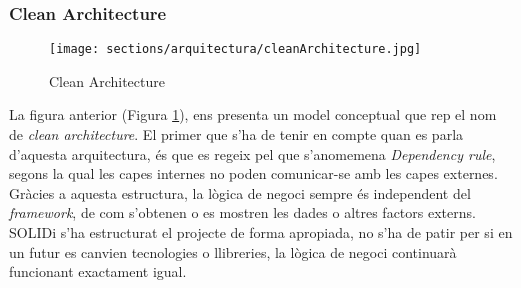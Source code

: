 \subsubsection{Clean Architecture}
\label{arquitectura:back_clean}
\begin{figure}[h]
\texttt{[image: sections/arquitectura/cleanArchitecture.jpg]}
\centering
\caption{Clean Architecture}
\label{fig:clean_architecture}
\end{figure}
La figura anterior (Figura \ref{fig:clean_architecture}), ens presenta un model conceptual que rep el nom de \textit{clean architecture}\cite{clean}.%
El primer que s'ha de tenir en compte quan es parla d'aquesta arquitectura, és que es regeix pel que s'anomemena \textit{Dependency rule}, segons la qual les capes internes no poden comunicar-se amb les capes externes.\\
\newline Gràcies a aquesta estructura, la lògica de negoci sempre és independent del \textit{framework}, de com s'obtenen o es mostren les dades o altres factors externs.\\
\newline SOLIDi s'ha estructurat el projecte de forma apropiada, no s'ha de patir per si en un futur es canvien tecnologies o llibreries, la lògica de negoci continuarà funcionant exactament igual.
\clearpage
